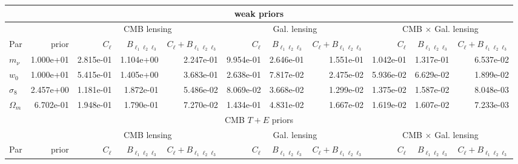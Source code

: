 \documentclass[11pt]{article} %
\begin{document}
\begin{table}
    \centering
    \scriptsize
    \begin{tabular}{|l|r|rrr|rrr|rrr|}
        \hline
        \multicolumn{11}{|c|}{weak priors} \\
        \hline
        && \multicolumn{3}{c|}{CMB lensing}& \multicolumn{3}{c|}{Gal. lensing}& \multicolumn{3}{c|}{CMB $\times$ Gal. lensing} \\
        \hline
        Par            &   prior &   $C_\ell$ &   $B_{\ell_1\ell_2\ell_3}$ &   $C_\ell + B_{\ell_1\ell_2\ell_3}$ &   $C_\ell$ &   $B_{\ell_1\ell_2\ell_3}$ &   $C_\ell + B_{\ell_1\ell_2\ell_3}$ &   $C_\ell$ &   $B_{\ell_1\ell_2\ell_3}$ &   $C_\ell + B_{\ell_1\ell_2\ell_3}$ \\
\hline
 $m_\nu$    & 1.000e+01 &  2.815e-01 &                  1.104e+00 &                           2.247e-01 &  9.954e-01 &                  2.646e-01 &                           1.551e-01 &  1.042e-01 &                  1.317e-01 &                           6.537e-02 \\
 $w_0$      & 1.000e+01 &  5.415e-01 &                  1.405e+00 &                           3.683e-01 &  2.638e-01 &                  7.817e-02 &                           2.475e-02 &  5.936e-02 &                  6.629e-02 &                           1.899e-02 \\
 $\sigma_8$ & 2.457e+00 &  1.181e-01 &                  1.872e-01 &                           5.486e-02 &  8.069e-02 &                  3.668e-02 &                           1.299e-02 &  1.375e-02 &                  1.587e-02 &                           8.048e-03 \\
 $\Omega_m$ & 6.702e-01 &  1.948e-01 &                  1.790e-01 &                           7.270e-02 &  1.434e-01 &                  4.831e-02 &                           1.667e-02 &  1.619e-02 &                  1.607e-02 &                           7.233e-03 \\
       \hline
        \multicolumn{11}{|c|}{CMB $T + E$ priors} \\
        \hline
        && \multicolumn{3}{c|}{CMB lensing}& \multicolumn{3}{c|}{Gal. lensing}& \multicolumn{3}{c|}{CMB $\times$ Gal. lensing} \\
        \hline
         Par            &   prior &   $C_\ell$ &   $B_{\ell_1\ell_2\ell_3}$ &   $C_\ell + B_{\ell_1\ell_2\ell_3}$ &   $C_\ell$ &   $B_{\ell_1\ell_2\ell_3}$ &   $C_\ell + B_{\ell_1\ell_2\ell_3}$ &   $C_\ell$ &   $B_{\ell_1\ell_2\ell_3}$ &   $C_\ell + B_{\ell_1\ell_2\ell_3}$ \\

\end{tabular}
\end{table}
\end{document}
